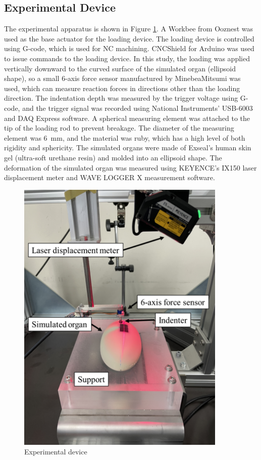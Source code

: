 \subsection*{Experimental Device}
The experimental apparatus is shown in Figure \ref{fig:expdeviceynu}.
A Workbee from Ooznest was used as the base actuator for the loading device. The loading device is controlled using G-code, which is used for NC machining. CNCShield for Arduino was used to issue commands to the loading device. In this study, the loading was applied vertically downward to the curved surface of the simulated organ (ellipsoid shape), so a small 6-axis force sensor manufactured by MinebeaMitsumi was used, which can measure reaction forces in directions other than the loading direction. The indentation depth was measured by the trigger voltage using G-code, and the trigger signal was recorded using National Instruments' USB-6003 and DAQ Express software. A spherical measuring element was attached to the tip of the loading rod to prevent breakage. The diameter of the measuring element was \SI{6}{\milli \meter}, and the material was ruby, which has a high level of both rigidity and sphericity. The simulated organs were made of Exseal's human skin gel (ultra-soft urethane resin) and molded into an ellipsoid shape. The deformation of the simulated organ was measured using KEYENCE's IX150 laser displacement meter and WAVE LOGGER X measurement software.

\begin{figure}%
	\centering
   \quad
   \includegraphics[width=10cm]{Images/appendix/ynu/fig1experimentaldevice.png}%
   \caption{Experimental device}%
   \label{fig:expdeviceynu}%
\end{figure}

